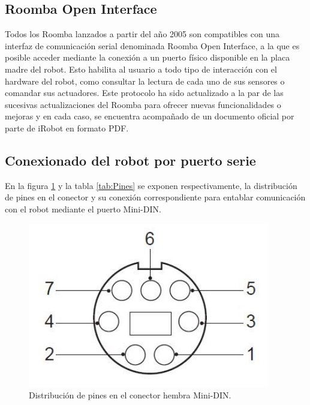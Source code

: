 \subsection{Roomba Open Interface}\label{sec:openInterface}
Todos los Roomba lanzados a partir del año 2005 son compatibles con una interfaz de comunicación serial denominada Roomba Open Interface, a la que es posible acceder mediante la conexión a un puerto físico disponible en la placa madre del robot. Esto habilita al usuario a todo tipo de interacción con el hardware del robot, como consultar la lectura de cada uno de sus sensores o comandar sus actuadores. Este protocolo ha sido actualizado a la par de las sucesivas actualizaciones del Roomba para ofrecer nuevas funcionalidades o mejoras y en cada caso, se encuentra acompañado de un documento oficial por parte de iRobot en formato PDF\protect\footnotemark.



\subsection{Conexionado del robot por puerto serie}

En la figura \ref{fig:roombaPinout} y la tabla \ref{tab:Pines} se exponen respectivamente, la distribución de pines en el conector y su conexión correspondiente para entablar comunicación con el robot mediante el puerto Mini-DIN.

\begin{figure}[ht]
    \centering
    \includegraphics[scale=.3]{./Figures/pinout.png}
    \caption{Distribución de pines en el conector hembra Mini-DIN.}
    \label{fig:roombaPinout}
\end{figure}

